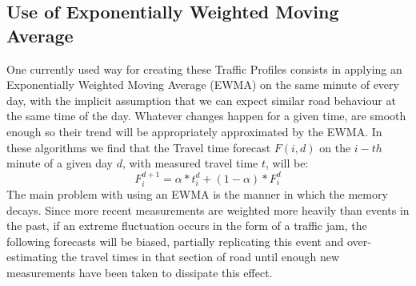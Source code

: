 \documentclass[conference]{IEEEtran}
\begin{document}
\subsection{Use of Exponentially Weighted Moving Average} \label{ewma}
One currently used way for creating these Traffic Profiles consists in applying an Exponentially Weighted Moving Average (EWMA) on the same minute of every day, with the implicit assumption that we can expect similar road behaviour at the same time of the day. 
Whatever changes happen for a given time, are smooth enough so their trend will be appropriately approximated by the EWMA.
In these algorithms we find that the Travel time forecast $F(i,d)$ on the $i-th$ minute of a given day $d$, with measured travel time $t$, will be:
\begin{equation}
F^{d+1}_i = \alpha * t^{d}_{i} + (1-\alpha)*F^{d}_{i}
\end{equation}
The main problem with using an EWMA is the manner in which the memory decays. 
Since more recent measurements are weighted more heavily than events in the past, if an extreme fluctuation occurs in the form of a traffic jam, the following forecasts will be biased, partially replicating this event and over-estimating the travel times in that section of road until enough new measurements have been taken to dissipate this effect.
\end{document}
